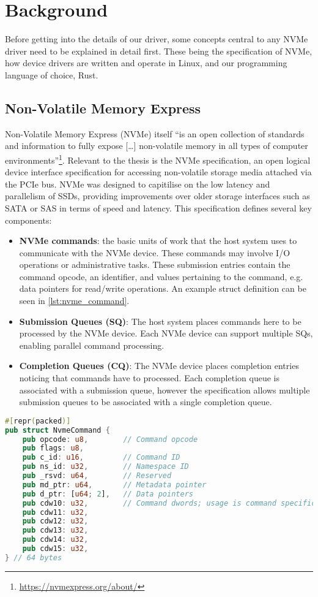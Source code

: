 \chapter{Background}\label{chapter:basics}

Before getting into the details of our driver, some concepts central to any NVMe driver need to be explained in detail first. These being the specification of NVMe, how device drivers are written and operate in Linux, and our programming language of choice, Rust.

\section{Non-Volatile Memory Express}
Non-Volatile Memory Express (NVMe) itself ``is an open collection of standards and information to fully expose [\ldots] non-volatile memory in all types of computer environments''\footnote{\url{https://nvmexpress.org/about/}}. Relevant to the thesis is the NVMe specification, an open logical device interface specification for accessing non-volatile storage media attached via the PCIe bus. NVMe was designed to capitilise on the low latency and parallelism of SSDs, providing improvements over older storage interfaces such as SATA or SAS in terms of speed and latency. This specification defines several key components:
\begin{itemize}
        \item \textbf{NVMe commands}: the basic units of work that the host system uses to communicate with the NVMe device. These commands may involve I/O operations or administrative tasks. These submission entries contain the command opcode, an identifier, and values pertaining to the command, e.g. data pointers for read/write operations. An example struct definition can be seen in \autoref{lst:nvme_command}.
        \item \textbf{Submission Queues (SQ)}: The host system places commands here to be processed by the NVMe device. Each NVMe device can support multiple SQs, enabling parallel command processing.
        \item \textbf{Completion Queues (CQ)}: The NVMe device places completion entries noticing that commands have to processed. Each completion queue is associated with a submission queue, however the specification allows multiple submission queues to be associated with a single completion queue.
\end{itemize}

\begin{lstlisting}[float,language=Rust,label=lst:nvme_command,caption=NVMe command defined as a struct in Rust]
#[repr(packed)]
pub struct NvmeCommand {
    pub opcode: u8,        // Command opcode
    pub flags: u8,
    pub c_id: u16,         // Command ID
    pub ns_id: u32,        // Namespace ID
    pub _rsvd: u64,        // Reserved
    pub md_ptr: u64,       // Metadata pointer
    pub d_ptr: [u64; 2],   // Data pointers
    pub cdw10: u32,        // Command dwords; usage is command specific
    pub cdw11: u32,
    pub cdw12: u32,
    pub cdw13: u32,
    pub cdw14: u32,
    pub cdw15: u32,
} // 64 bytes
\end{lstlisting}

